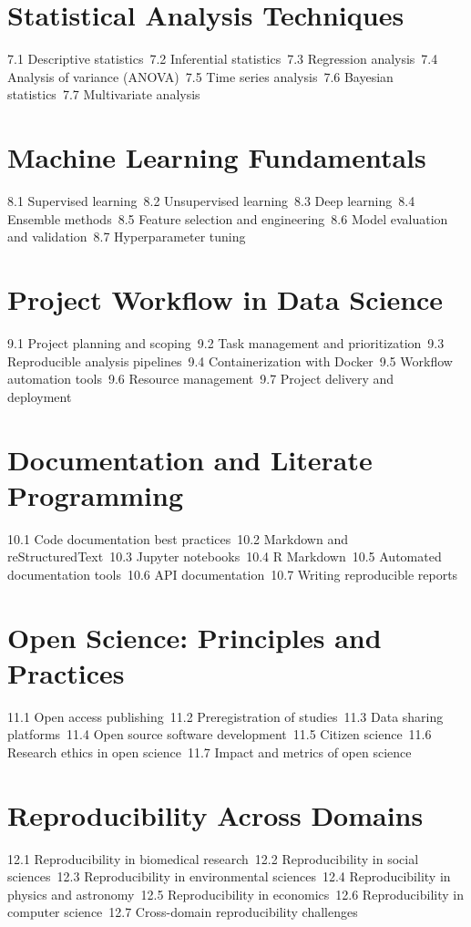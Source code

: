 \section{Statistical Analysis Techniques}
7.1 Descriptive statistics\
7.2 Inferential statistics\
7.3 Regression analysis\
7.4 Analysis of variance (ANOVA)\
7.5 Time series analysis\
7.6 Bayesian statistics\
7.7 Multivariate analysis\
\section{Machine Learning Fundamentals}
8.1 Supervised learning\
8.2 Unsupervised learning\
8.3 Deep learning\
8.4 Ensemble methods\
8.5 Feature selection and engineering\
8.6 Model evaluation and validation\
8.7 Hyperparameter tuning\
\section{Project Workflow in Data Science}
9.1 Project planning and scoping\
9.2 Task management and prioritization\
9.3 Reproducible analysis pipelines\
9.4 Containerization with Docker\
9.5 Workflow automation tools\
9.6 Resource management\
9.7 Project delivery and deployment\
\section{Documentation and Literate Programming}
10.1 Code documentation best practices\
10.2 Markdown and reStructuredText\
10.3 Jupyter notebooks\
10.4 R Markdown\
10.5 Automated documentation tools\
10.6 API documentation\
10.7 Writing reproducible reports\
\section{Open Science: Principles and Practices}
11.1 Open access publishing\
11.2 Preregistration of studies\
11.3 Data sharing platforms\
11.4 Open source software development\
11.5 Citizen science\
11.6 Research ethics in open science\
11.7 Impact and metrics of open science\
\section{Reproducibility Across Domains}
12.1 Reproducibility in biomedical research\
12.2 Reproducibility in social sciences\
12.3 Reproducibility in environmental sciences\
12.4 Reproducibility in physics and astronomy\
12.5 Reproducibility in economics\
12.6 Reproducibility in computer science\
12.7 Cross-domain reproducibility challenges\
